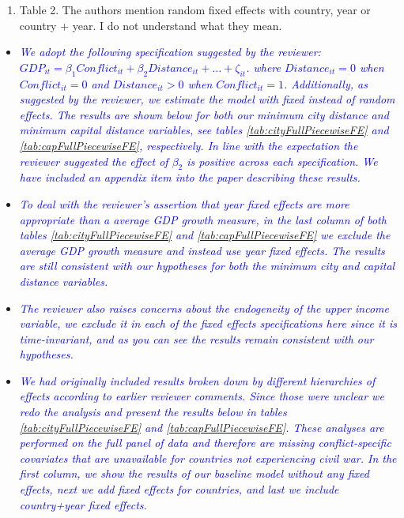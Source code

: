 \begin{enumerate}
\begin{enumerate}
	\item Table 2. The authors mention random fixed effects with country, year or country + year. I do not understand what they mean. \\	
\end{enumerate}

\begin{itemize}
\item \textcolor{blue}{\emph{
	We adopt the following specification suggested by the reviewer: $GDP_{it} = \beta_{1}Conflict_{it} + \beta_{2}Distance_{it}+\ldots+\zeta_{it}$. where $Distance_{it}=0$ when $Conflict_{it}=0$ and $Distance_{it}>0$ when $Conflict_{it}=1$. Additionally, as suggested by the reviewer, we estimate the model with fixed instead of random effects. The results are shown below for both our minimum city distance and minimum capital distance variables, see tables \ref{tab:cityFullPiecewiseFE} and \ref{tab:capFullPiecewiseFE}, respectively. In line with the expectation the reviewer suggested the effect of $\beta_{2}$ is positive across each specification. We have included an appendix item into the paper describing these results.
}} \\

\item \textcolor{blue}{\emph{
	To deal with the reviewer's assertion that year fixed effects are more appropriate than a average GDP growth measure, in the last column of both tables \ref{tab:cityFullPiecewiseFE} and \ref{tab:capFullPiecewiseFE} we exclude the average GDP growth measure and instead use year fixed effects. The results are still consistent with our hypotheses for both the minimum city and capital distance variables.
}} \\

\item \textcolor{blue}{\emph{
	The reviewer also raises concerns about the endogeneity of the upper income variable, we exclude it in each of the fixed effects specifications here since it is time-invariant, and as you can see the results remain consistent with our hypotheses.
}} \\

\item \textcolor{blue}{\emph{
	We had originally included results broken down by different hierarchies of effects according to earlier reviewer comments. Since those were unclear we redo the analysis and present the results below in tables \ref{tab:cityFullPiecewiseFE} and \ref{tab:capFullPiecewiseFE}. These analyses are performed on the full panel of data and therefore are missing conflict-specific covariates that are unavailable for countries not experiencing civil war. In the first column, we show the results of our baseline model without any fixed effects, next we add fixed effects for countries, and last we include country+year fixed effects.
}} \\


\end{itemize}
\end{enumerate}
